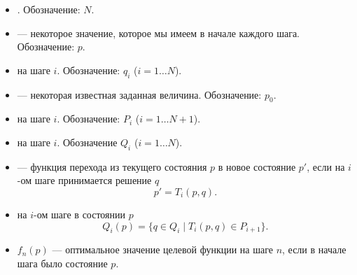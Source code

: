 \begin{itemize}[nosep]
	\item {}. Обозначение: $\boxed{N}$.
	
	\item {} --- некоторое значение, которое мы имеем в начале каждого шага. Обозначение: $\boxed{p}$.
	
	\item {} на шаге $i$. Обозначение: $\boxed{q_i}$ ($i = 1 \dots N$).
	
	\item {} --- некоторая известная заданная величина. Обозначение: $\boxed{p_0}$.
	
	\item {} на шаге $i$. Обозначение: $\boxed{P_i}$ ($i = 1 \dots N+1$).
	
	\item {} на шаге $i$. Обозначение $\boxed{Q_i}$ ($i = 1 \dots N$).
	
	\item {} --- функция перехода из текущего состояния $p$ в новое состояние $p'$, если на $i$-ом шаге принимается решение $q$
	\[
	p' = \boxed{T_i(p, q)}.
	\]
	
	\item {} на $i$-ом шаге в состоянии $p$
	\[
	\boxed{Q_i(p) = \{q \in Q_i \; \big| \; T_i(p, q) \in P_{i+1}\}}.
	\]
	
	\item $\boxed{f_n(p)}$ --- оптимальное значение целевой функции на шаге $n$, если в начале шага было состояние $p$.
\end{itemize}

